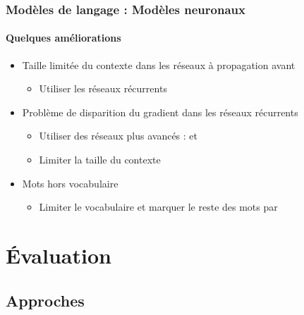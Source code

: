 \documentclass[xcolor=table]{beamer}
\begin{document}
\begin{frame}
\frametitle{Modèles de langage : Modèles neuronaux}
\framesubtitle{Quelques améliorations}

\begin{itemize}
	\item Taille limitée du contexte dans les réseaux à propagation avant
	\begin{itemize}
		\item Utiliser les réseaux récurrents
	\end{itemize}
	\item Problème de disparition du gradient dans les réseaux récurrents
	\begin{itemize}
		\item Utiliser des réseaux plus avancés :  et 
		\item Limiter la taille du contexte 
	\end{itemize}
	\item Mots hors vocabulaire
	\begin{itemize}
		\item Limiter le vocabulaire  et marquer le reste des mots par 
	\end{itemize}
\end{itemize}

\end{frame}

\section{Évaluation}

\subsection{Approches}
\end{document}
